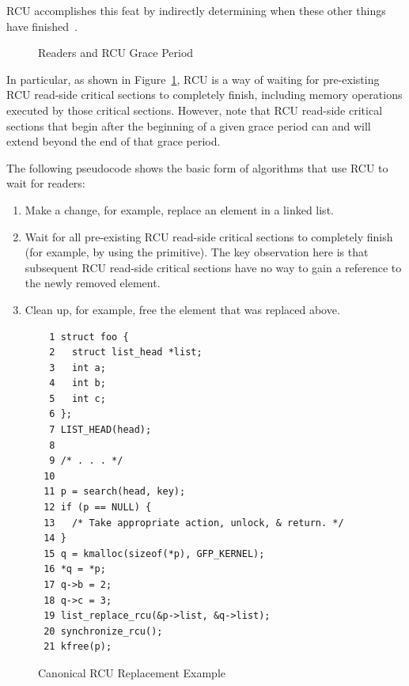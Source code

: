 RCU accomplishes this feat by indirectly determining when these
other things have finished~\cite{PaulEMcKenney2007whatisRCU,
PaulEMcKenney2007PreemptibleRCU}.

\begin{figure}[tb]
\begin{center}
\end{center}
\caption{Readers and RCU Grace Period}
\label{fig:defer:Readers and RCU Grace Period}
\end{figure}

In particular, as shown in
Figure~\ref{fig:defer:Readers and RCU Grace Period},
RCU is a way of
waiting for pre-existing RCU read-side critical sections to completely
finish, including memory operations executed by those critical sections.
However, note that RCU read-side critical sections
that begin after the beginning
of a given grace period can and will extend beyond the end of that grace
period.

The following pseudocode shows the basic form of algorithms that use
RCU to wait for readers:

\begin{enumerate}
\item	Make a change, for example, replace an element in a linked list.
\item	Wait for all pre-existing RCU read-side critical sections to
	completely finish (for example, by using the
	 primitive).
	The key observation here is that subsequent RCU read-side critical
	sections have no way to gain a reference to the newly removed
	element.
\item	Clean up, for example, free the element that was replaced above.
\end{enumerate}

\begin{figure}[tbp]
{ \scriptsize
\begin{verbatim}
  1 struct foo {
  2   struct list_head *list;
  3   int a;
  4   int b;
  5   int c;
  6 };
  7 LIST_HEAD(head);
  8
  9 /* . . . */
 10
 11 p = search(head, key);
 12 if (p == NULL) {
 13   /* Take appropriate action, unlock, & return. */
 14 }
 15 q = kmalloc(sizeof(*p), GFP_KERNEL);
 16 *q = *p;
 17 q->b = 2;
 18 q->c = 3;
 19 list_replace_rcu(&p->list, &q->list);
 20 synchronize_rcu();
 21 kfree(p);
\end{verbatim}
}
\caption{Canonical RCU Replacement Example}
\label{fig:defer:Canonical RCU Replacement Example}
\end{figure}

